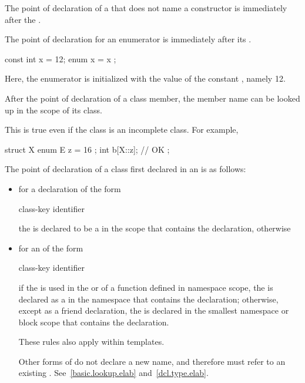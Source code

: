 \pnum
The point of declaration of a  that does not name a
constructor is immediately after the .

\pnum
{}%
The point of declaration for an enumerator is immediately after its
.
\begin{example}
\begin{codeblock}
const int x = 12;
{ enum { x = x }; }
\end{codeblock}
Here, the enumerator  is initialized with the value of the
constant , namely 12.
\end{example}

\pnum
After the point of declaration of a class member, the member name can be
looked up in the scope of its class.
\begin{note}
%
This is true even if the class is an incomplete class. For example,
\begin{codeblock}
struct X {
  enum E { z = 16 };
  int b[X::z];      // OK
};
\end{codeblock}
\end{note}

\pnum
The point of declaration of a class first declared in an
 is as follows:
\begin{itemize}
\item for a declaration of the form
\begin{ncbnf}
class-key  identifier \terminal{;}
\end{ncbnf}
the  is declared to be a
 in the scope that contains the declaration,
otherwise
\item for an  of the form
\begin{ncbnf}
class-key identifier
\end{ncbnf}
if the
 is used in the
 or 
of a function defined in namespace scope, the  is
declared as a  in the namespace that contains the
declaration; otherwise, except as a friend declaration, the
 is declared in the smallest namespace or block
scope that contains the declaration.
\begin{note}
These rules also apply within templates.
\end{note}
\begin{note}
Other
forms of  do not declare a new name,
and therefore must refer to an existing .
See~\ref{basic.lookup.elab} and~\ref{dcl.type.elab}.
\end{note}
\end{itemize}

